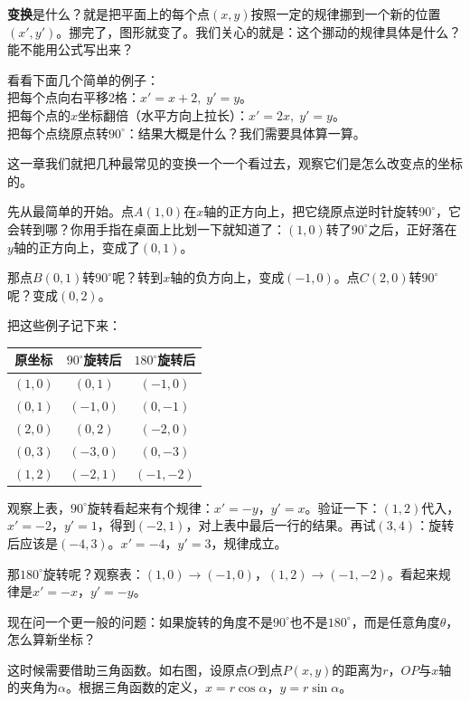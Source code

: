 \documentclass[a4paper,12pt]{ctexart}
\begin{document}
\textbf{变换}是什么？就是把平面上的每个点$(x,y)$按照一定的规律挪到一个新的位置$(x',y')$。挪完了，图形就变了。我们关心的就是：这个挪动的规律具体是什么？能不能用公式写出来？

看看下面几个简单的例子：\\
把每个点向右平移2格：$x'=x+2,\;y'=y$。\\
把每个点的$x$坐标翻倍（水平方向上拉长）：$x'=2x,\;y'=y$。\\
把每个点绕原点转$90^\circ$：结果大概是什么？我们需要具体算一算。

这一章我们就把几种最常见的变换一个一个看过去，观察它们是怎么改变点的坐标的。


先从最简单的开始。点$A(1,0)$在$x$轴的正方向上，把它绕原点逆时针旋转$90^\circ$，它会转到哪？你用手指在桌面上比划一下就知道了：$(1,0)$转了$90^\circ$之后，正好落在$y$轴的正方向上，变成了$(0,1)$。

那点$B(0,1)$转$90^\circ$呢？转到$x$轴的负方向上，变成$(-1,0)$。点$C(2,0)$转$90^\circ$呢？变成$(0,2)$。

把这些例子记下来：

\begin{center}
\begin{tabular}{c|c|c}
原坐标 & $90^\circ$旋转后 & $180^\circ$旋转后\\\hline
$(1,0)$ & $(0,1)$ & $(-1,0)$\\
$(0,1)$ & $(-1,0)$ & $(0,-1)$\\
$(2,0)$ & $(0,2)$ & $(-2,0)$\\
$(0,3)$ & $(-3,0)$ & $(0,-3)$\\
$(1,2)$ & $(-2,1)$ & $(-1,-2)$
\end{tabular}
\end{center}

观察上表，$90^\circ$旋转看起来有个规律：$x'=-y$，$y'=x$。验证一下：$(1,2)$代入，$x'=-2$，$y'=1$，得到$(-2,1)$，对上表中最后一行的结果。再试$(3,4)$：旋转后应该是$(-4,3)$。$x'=-4$，$y'=3$，规律成立。

那$180^\circ$旋转呢？观察表：$(1,0)\to(-1,0)$，$(1,2)\to(-1,-2)$。看起来规律是$x'=-x$，$y'=-y$。

现在问一个更一般的问题：如果旋转的角度不是$90^\circ$也不是$180^\circ$，而是任意角度$\theta$，怎么算新坐标？

这时候需要借助三角函数。如右图，设原点$O$到点$P(x,y)$的距离为$r$，$OP$与$x$轴的夹角为$\alpha$。根据三角函数的定义，$x=r\cos\alpha$，$y=r\sin\alpha$。
\end{document}
